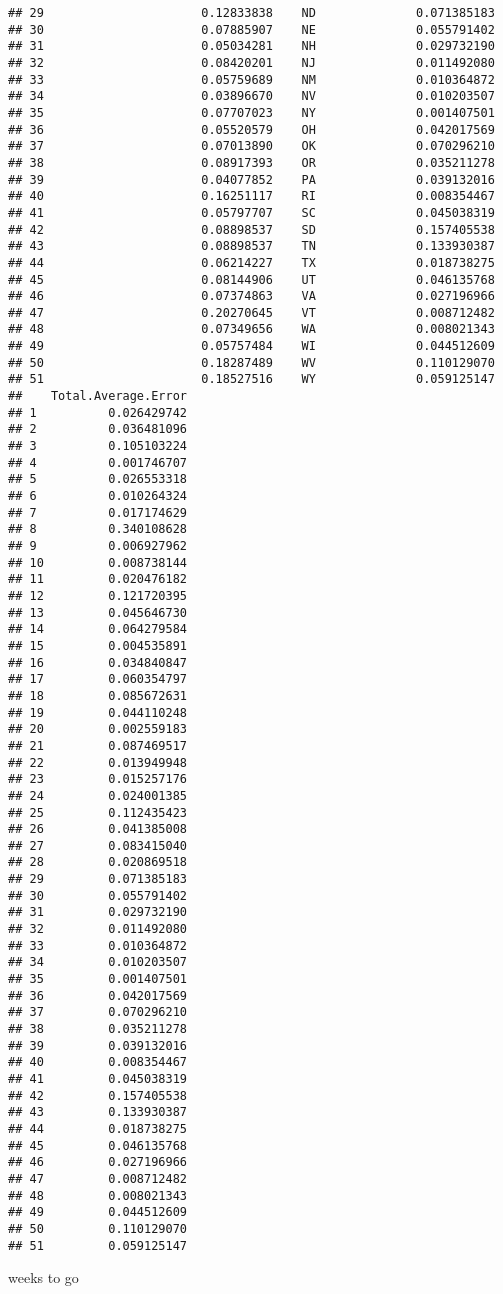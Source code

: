 \documentclass{article}\usepackage[]{graphicx}\usepackage[]{color}
\makeatletter
\newenvironment{kframe}{%
 \def\at@end@of@kframe{}%
 \ifinner\ifhmode%
  \def\at@end@of@kframe{\end{minipage}}%
  \begin{minipage}{\columnwidth}%
 \fi\fi%
 \def\FrameCommand##1{\hskip\@totalleftmargin \hskip-\fboxsep
 \colorbox{shadecolor}{##1}\hskip-\fboxsep
     \hskip-\linewidth \hskip-\@totalleftmargin \hskip\columnwidth}%
 \MakeFramed {\advance\hsize-\width
   \@totalleftmargin\z@ \linewidth\hsize
   \@setminipage}}%
 {\par\unskip\endMakeFramed%
 \at@end@of@kframe}
\newenvironment{knitrout}{}{} %
\makeatother
\begin{document}
\begin{knitrout}
\begin{kframe}
\begin{verbatim}
## 29                      0.12833838    ND              0.071385183
## 30                      0.07885907    NE              0.055791402
## 31                      0.05034281    NH              0.029732190
## 32                      0.08420201    NJ              0.011492080
## 33                      0.05759689    NM              0.010364872
## 34                      0.03896670    NV              0.010203507
## 35                      0.07707023    NY              0.001407501
## 36                      0.05520579    OH              0.042017569
## 37                      0.07013890    OK              0.070296210
## 38                      0.08917393    OR              0.035211278
## 39                      0.04077852    PA              0.039132016
## 40                      0.16251117    RI              0.008354467
## 41                      0.05797707    SC              0.045038319
## 42                      0.08898537    SD              0.157405538
## 43                      0.08898537    TN              0.133930387
## 44                      0.06214227    TX              0.018738275
## 45                      0.08144906    UT              0.046135768
## 46                      0.07374863    VA              0.027196966
## 47                      0.20270645    VT              0.008712482
## 48                      0.07349656    WA              0.008021343
## 49                      0.05757484    WI              0.044512609
## 50                      0.18287489    WV              0.110129070
## 51                      0.18527516    WY              0.059125147
##    Total.Average.Error
## 1          0.026429742
## 2          0.036481096
## 3          0.105103224
## 4          0.001746707
## 5          0.026553318
## 6          0.010264324
## 7          0.017174629
## 8          0.340108628
## 9          0.006927962
## 10         0.008738144
## 11         0.020476182
## 12         0.121720395
## 13         0.045646730
## 14         0.064279584
## 15         0.004535891
## 16         0.034840847
## 17         0.060354797
## 18         0.085672631
## 19         0.044110248
## 20         0.002559183
## 21         0.087469517
## 22         0.013949948
## 23         0.015257176
## 24         0.024001385
## 25         0.112435423
## 26         0.041385008
## 27         0.083415040
## 28         0.020869518
## 29         0.071385183
## 30         0.055791402
## 31         0.029732190
## 32         0.011492080
## 33         0.010364872
## 34         0.010203507
## 35         0.001407501
## 36         0.042017569
## 37         0.070296210
## 38         0.035211278
## 39         0.039132016
## 40         0.008354467
## 41         0.045038319
## 42         0.157405538
## 43         0.133930387
## 44         0.018738275
## 45         0.046135768
## 46         0.027196966
## 47         0.008712482
## 48         0.008021343
## 49         0.044512609
## 50         0.110129070
## 51         0.059125147
\end{verbatim}
\end{kframe}
\end{knitrout}
6 weeks to go
\end{document}
